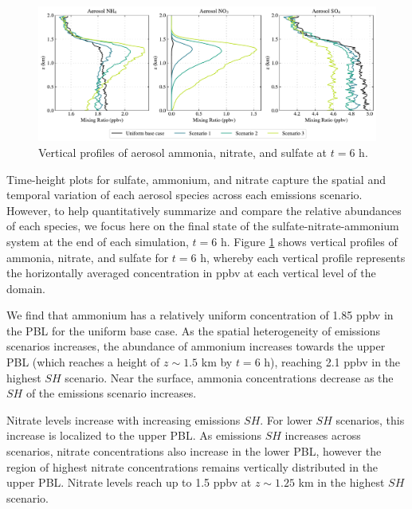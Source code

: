 
\begin{figure}[!t]
  \centering
    \includegraphics[width=\textwidth]{figures/chapter5/aerosol-SNA-vertical-profiles-time36.pdf}
    \caption{Vertical profiles of aerosol ammonia, nitrate, and sulfate at $t=6$ h.}
    \label{fig:sna-vertical-profile}
\end{figure}

Time-height plots for sulfate, ammonium, and nitrate capture the spatial and temporal variation of each aerosol species across each emissions scenario. However, to help quantitatively summarize and compare the relative abundances of each species, we focus here on the final state of the sulfate-nitrate-ammonium system at the end of each simulation, $t=6$ h. Figure \ref{fig:sna-vertical-profile} shows vertical profiles of ammonia, nitrate, and sulfate for $t=6$ h, whereby each vertical profile represents the horizontally averaged concentration in ppbv at each vertical level of the domain.

We find that ammonium has a relatively uniform concentration of 1.85 ppbv in the PBL for the uniform base case. As the spatial heterogeneity of emissions scenarios increases, the abundance of ammonium increases towards the upper PBL (which reaches a height of $z\sim1.5$ km by $t=6$ h), reaching 2.1 ppbv in the highest $SH$ scenario. Near the surface, ammonia concentrations decrease as the $SH$ of the emissions scenario increases. 

Nitrate levels increase with increasing emissions $SH$. For lower $SH$ scenarios, this increase is localized to the upper PBL. As emissions $SH$ increases across scenarios, nitrate concentrations also increase in the lower PBL, however the region of highest nitrate concentrations remains vertically distributed in the upper PBL. Nitrate levels reach up to 1.5 ppbv at $z\sim1.25$ km in the highest $SH$ scenario.  

